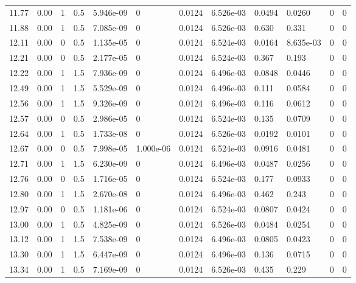 \documentclass[preview]{standalone}
\begin{document}
{{{\begin{tabular}{L{1.2cm}C{1.2cm} C{0.3cm}C{0.5cm} C{1.4cm}C{1.4cm} C{1.4cm}C{1.4cm} C{1.6cm}C{1.6cm} C{1.6cm}C{1.6cm}}
  11.77  &  0.00  & 1     & 0.5 &  5.946e-09  & 0  &  0.0124&   6.526e-03& 0.0494 & 0.0260   &  0 & 0  \\ 
  11.88  &  0.00  & 1     & 0.5 &  7.085e-09  & 0  &  0.0124&   6.526e-03& 0.630 & 0.331   &  0 & 0  \\ 
  12.11  &  0.00  & 0     & 0.5 &  1.135e-05  & 0  &  0.0124&   6.524e-03& 0.0164 & 8.635e-03   &  0 & 0  \\ 
  12.21  &  0.00  & 0     & 0.5 &  2.177e-05  & 0  &  0.0124&   6.524e-03& 0.367 & 0.193   &  0 & 0  \\ 
  12.22  &  0.00  & 1     & 1.5 &  7.936e-09  & 0  &  0.0124&   6.496e-03& 0.0848 & 0.0446   &  0 & 0  \\ 
  12.49  &  0.00  & 1     & 1.5 &  5.529e-09  & 0  &  0.0124&   6.496e-03& 0.111 & 0.0584   &  0 & 0  \\ 
  12.56  &  0.00  & 1     & 1.5 &  9.326e-09  & 0  &  0.0124&   6.496e-03& 0.116 & 0.0612   &  0 & 0  \\ 
  12.57  &  0.00  & 0     & 0.5 &  2.986e-05  & 0  &  0.0124&   6.524e-03& 0.135 & 0.0709   &  0 & 0  \\ 
  12.64  &  0.00  & 1     & 0.5 &  1.733e-08  & 0  &  0.0124&   6.526e-03& 0.0192 & 0.0101   &  0 & 0  \\ 
  12.67  &  0.00  & 0     & 0.5 &  7.998e-05  & 1.000e-06  &  0.0124&   6.524e-03& 0.0916 & 0.0481   &  0 & 0  \\ 
  12.71  &  0.00  & 1     & 1.5 &  6.230e-09  & 0  &  0.0124&   6.496e-03& 0.0487 & 0.0256   &  0 & 0  \\ 
  12.76  &  0.00  & 0     & 0.5 &  1.716e-05  & 0  &  0.0124&   6.524e-03& 0.177 & 0.0933   &  0 & 0  \\ 
  12.80  &  0.00  & 1     & 1.5 &  2.670e-08  & 0  &  0.0124&   6.496e-03& 0.462 & 0.243   &  0 & 0  \\ 
  12.97  &  0.00  & 0     & 0.5 &  1.181e-06  & 0  &  0.0124&   6.524e-03& 0.0807 & 0.0424   &  0 & 0  \\ 
  13.00  &  0.00  & 1     & 0.5 &  4.825e-09  & 0  &  0.0124&   6.526e-03& 0.0484 & 0.0254   &  0 & 0  \\ 
  13.12  &  0.00  & 1     & 1.5 &  7.538e-09  & 0  &  0.0124&   6.496e-03& 0.0805 & 0.0423   &  0 & 0  \\ 
  13.30  &  0.00  & 1     & 1.5 &  6.447e-09  & 0  &  0.0124&   6.496e-03& 0.136 & 0.0715   &  0 & 0  \\ 
  13.34  &  0.00  & 1     & 0.5 &  7.169e-09  & 0  &  0.0124&   6.526e-03& 0.435 & 0.229   &  0 & 0  \\ 

\end{tabular}}}}
\end{document}
